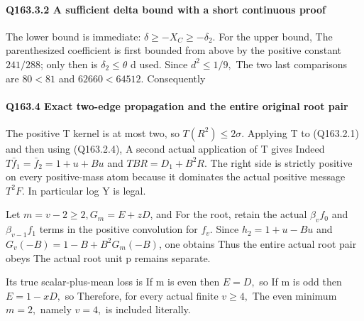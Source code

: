 \paragraph{Q163.3.2 A sufficient delta bound with a short continuous proof}

The lower bound is immediate: \(\delta\ge -X_C\ge -\delta_2.\) For the upper bound,
The parenthesized coefficient is first bounded from above by the positive
constant \(241/288\); only then is \(\delta_2\le \theta\) d used.  Since \(d^2\le 1/9,\allowbreak \)
The two last comparisons are \(80<81\) and \(62660<64512.\)
Consequently

\paragraph{Q163.4 Exact two-edge propagation and the entire original root pair}

The positive T kernel is at most two, so \(T(R^2)\le2\sigma\).
Applying T to (Q163.2.1) and then using (Q163.2.4),
A second actual application of T gives
Indeed \(T\bar f_{1}=\bar f_2=1+u+Bu\) and \(TBR=D_1+B^2R\).
The right side is strictly positive on every positive-mass atom because
it dominates the actual positive message \(T^2F.\) In particular log Y is legal.

Let \(m=v-2\ge 2,\allowbreak  G_m=E+zD\), and
For the root, retain the actual \(\beta_v f_0\) and \(\beta_{v-1} f_1\) terms in
the positive convolution for \(f_v.\) Since \(h_2=1+u-Bu\) and
\(G_v(-B)=1-B+B^2G_m(-B)\), one obtains
Thus the entire actual root pair obeys
The actual root unit p remains separate.

Its true scalar-plus-mean loss is
If m is even then \(E=D,\allowbreak \) so
If m is odd then \(E=1-xD,\allowbreak \) so
Therefore, for every actual finite \(v\ge 4,\allowbreak \)
The even minimum \(m=2,\allowbreak \) namely \(v=4,\allowbreak \) is included literally.

